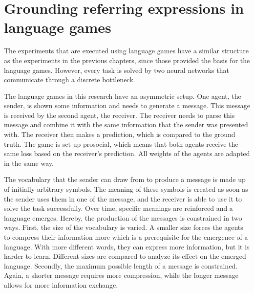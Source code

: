 \section{Grounding referring expressions in language games}
\label{sec:language-games}
The experiments that are executed using language games have a similar structure as the experiments in the previous chapters, since those provided the basis for the language games.
However, every task is solved by two neural networks that communicate through a discrete bottleneck.

The language games in this research have an asymmetric setup.
One agent, the sender, is shown some information and needs to generate a message.
This message is received by the second agent, the receiver.
The receiver needs to parse this message and combine it with the same information that the sender was presented with.
The receiver then makes a prediction, which is compared to the ground truth.
The game is set up prosocial, which means that both agents receive the same loss based on the receiver's prediction.
All weights of the agents are adapted in the same way.

The vocabulary that the sender can draw from to produce a message is made up of initially arbitrary symbols.
The meaning of these symbols is created as soon as the sender uses them in one of the message, and the receiver is able to use it to solve the task successfully.
Over time, specific meanings are reinforced and a language emerges.
Hereby, the production of the messages is constrained in two ways.
First, the size of the vocabulary is varied.
A smaller size forces the agents to compress their information more which is a prerequisite for the emergence of a language.
With more different words, they can express more information, but it is harder to learn.
Different sizes are compared to analyze its effect on the emerged language.
Secondly, the maximum possible length of a message is constrained.
Again, a shorter message requires more compression, while the longer message allows for more information exchange.

